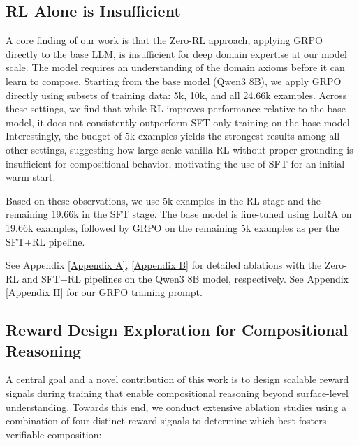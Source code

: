 \documentclass{article}
\theoremstyle{plain}
\theoremstyle{definition}
\theoremstyle{remark}
\begin{document}
\subsection{RL Alone is Insufficient}
\label{RL_ablations}
A core finding of our work is that the Zero-RL approach, applying GRPO directly to the base LLM, is insufficient for deep domain expertise at our model scale. The model requires an understanding of the domain axioms before it can learn to compose. Starting from the base model (Qwen3 8B), we apply GRPO directly using subsets of training data: 5k, 10k, and all 24.66k examples. Across these settings, we find that while RL improves performance relative to the base model, it does not consistently outperform SFT-only training on the base model. Interestingly, the budget of 5k examples yields the strongest results among all other settings, suggesting how large-scale vanilla RL without proper grounding is insufficient for compositional behavior, motivating the use of SFT for an initial warm start. 

Based on these observations, we use 5k examples in the RL stage and the remaining 19.66k in the SFT stage. The base model is fine-tuned using LoRA on 19.66k examples, followed by GRPO on the remaining 5k examples as per the SFT+RL pipeline.

See Appendix \ref{Appendix A}, \ref{Appendix B} for detailed ablations with the Zero-RL and SFT+RL pipelines on the Qwen3 8B model, respectively. See Appendix \ref{Appendix H} for our GRPO training prompt.

\subsection{Reward Design Exploration for Compositional Reasoning} %
A central goal and a novel contribution of this work is to design scalable reward signals during training that enable compositional reasoning beyond surface-level understanding. Towards this end, we conduct extensive ablation studies using a combination of four distinct reward signals to determine which best fosters verifiable composition:

\end{document}
